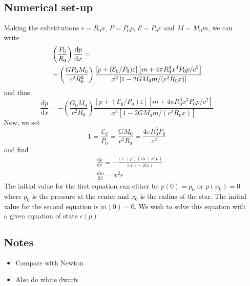\documentclass[twocolumn]{article}
\begin{document}
\begin{large}
\subsection*{Numerical set-up}
Making the substitutions $r = R_0x$, $P=P_0p$, $\mathcal{E} = P_0\varepsilon$ and $M = M_0m$, we can write 
\begin{equation}
    \begin{split}
        &\left(\frac{P_0}{R_0}\right)\frac{\text{d}p}{\text{d}x} = \\ 
        &\hspace{-0cm} -\left(\frac{GP_0M_0}{c^2R_0^2}\right)\frac{\left[p+(\mathcal{E}_0/P_0)\varepsilon\right]\left[m+4\pi R_0^3x^3P_0p/c^2\right]}{x^2\left[1-2GM_0m/(c^2R_0x)\right]}
    \end{split}
\end{equation}
and thus
\begin{equation}
    \frac{\text{d}p}{\text{d}x} = -\left(\frac{G_0M_0}{c^2R_0}\right)\frac{\left[p+(\mathcal{E}_0/P_0)\varepsilon\right]\left[m+4\pi R_0^3x^3P_0p/c^2\right]}{x^2\left[1-2GM_0m/(c^2R_0x)\right]}
\end{equation}
Now, we set 
\begin{equation}
    1 = \frac{\mathcal{E}_0}{P_0} = \frac{GM_0}{c^2R_0} = \frac{4\pi R_0^3P_0}{c^2}
\end{equation}
and find 
\begin{equation}
    \begin{split}
        &\frac{\text{d}p}{\text{d}x} = -\frac{(\varepsilon+p)(m+x^3p)}{x(x-2m)} \\  %
        &\frac{\text{d}m}{\text{d}x} = x^2\varepsilon %
    \end{split}
\end{equation}
The initial value for the first equation can either be $p(0) = p_0$ or $p(x_0) = 0$ where $p_0$ is the pressure at the center and $x_0$ is the radius of the star. The initial value for the second equation is $m(0)=0$. We wish to solve this equation with a given equation of state $\epsilon(p)$.

\subsection*{Notes}
\begin{itemize}
    \item Compare with Newton
    \item Also do white dwarfs
\end{itemize}




\end{large}
\end{document}
